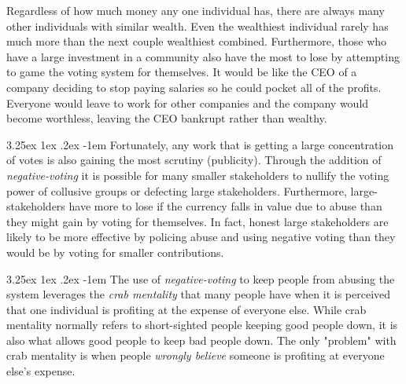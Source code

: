 \documentclass{article}
\makeatletter
\renewcommand\paragraph{\@startsection{paragraph}{5}{\z@}%
  {3.25ex \@plus1ex \@minus.2ex}%
  {-1em}%
  {\normalfont\normalsize\bfseries}}
\makeatother
\begin{document}
						Regardless of how much money any one individual has, there are always many other individuals with similar wealth. Even the wealthiest individual rarely has much more than the next couple wealthiest combined. Furthermore, those who have a large investment in a community also have the most to lose by attempting to game the voting system for themselves. It would be like the CEO of a company deciding to stop paying salaries so he could pocket all of the profits. Everyone would leave to work for other companies and the company would become worthless, leaving the CEO bankrupt rather than wealthy.

					\paragraph{}
						Fortunately, any work that is getting a large concentration of votes is also gaining the most scrutiny (publicity). Through the addition of \textit{negative-voting} it is possible for many smaller stakeholders to nullify the voting power of collusive groups or defecting large stakeholders. Furthermore, large-stakeholders have more to lose if the currency falls in value due to abuse than they might gain by voting for themselves. In fact, honest large stakeholders are likely to be more effective by policing abuse and using negative voting than they would be by voting for smaller contributions.

					\paragraph{}
						The use of \textit{negative-voting} to keep people from abusing the system leverages the \textit{crab mentality} that many people have when it is perceived that one individual is profiting at the expense of everyone else. While crab mentality normally refers to short-sighted people keeping good people down, it is also what allows good people to keep bad people down. The only "problem" with crab mentality is when people \textit{wrongly believe} someone is profiting at everyone else's expense.
\end{document}
